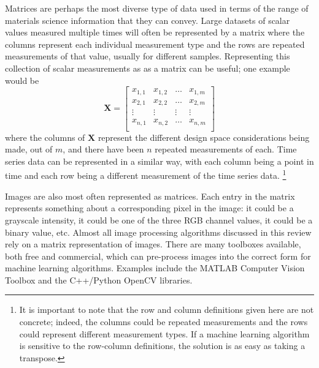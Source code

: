 Matrices are perhaps the most diverse type of data used in terms of the range of materials science information that they can convey. Large datasets of scalar values measured multiple times will often be represented by a matrix where the columns represent each individual measurement type and the rows are repeated measurements of that value, usually for different samples. Representing this collection of scalar measurements as as a matrix can be useful; one example would be
\begin{equation}
	\mathbf{X} = \begin{bmatrix} x_{1,1} & x_{1,2} & \hdots & x_{1,m} \\
						x_{2,1} & x_{2,2} & \hdots & x_{2,m} \\
						\vdots & \vdots & \vdots & \vdots \\
						x_{n,1} & x_{n,2} & \hdots & x_{n,m} \\
				\end{bmatrix}
	\label{matrix}
\end{equation}
where the columns of $\mathbf{X}$ represent the different design space considerations being made, out of $m$, and there have been $n$ repeated measurements of each. Time series data can be represented in a similar way, with each column being a point in time and each row being a different measurement of the time series data. \footnote{It is important to note that the row and column definitions given here are not concrete; indeed, the columns could be repeated measurements and the rows could represent different measurement types. If a machine learning algorithm is sensitive to the row-column definitions, the solution is as easy as taking a transpose.}

Images are also most often represented as matrices. Each entry in the matrix represents something about a corresponding pixel in the image: it could be a grayscale intensity, it could be one of the three RGB channel values, it could be a binary value, etc. Almost all image processing algorithms discussed in this review rely on a matrix representation of images. There are many toolboxes available, both free and commercial, which can pre-process images into the correct form for machine learning algorithms. Examples include the MATLAB Computer Vision Toolbox and the C++/Python OpenCV libraries.

